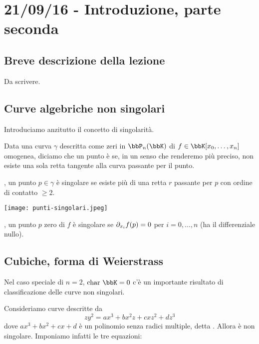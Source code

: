 \chapter{21/09/16 - Introduzione, parte seconda}
\section{Breve descrizione della lezione}
Da scrivere.
\section{Curve algebriche non singolari}

Introduciamo anzitutto il concetto di singolarità.

Data una curva $\gamma$ descritta come zeri in $\bbP_n(\bbK)$ di $f \in \bbK[x_0, \ldots,x_n]$ omogenea, diciamo che un punto è 
 se, in un senso che renderemo più preciso, non esiste una sola retta tangente alla curva passante per il punto. 

, un punto $p \in \gamma$ è singolare se esiste più di una retta $r$ passante per $p$ con ordine di contatto $\geq 2$. 
\vspace{1em}

\texttt{[image: punti-singolari.jpeg]}

, un punto $p$ zero di $f$ è singolare se $\partial_{x_i}f(p)=0$ per $i=0,\ldots,n$ (ha il differenziale nullo). 



\section{Cubiche, forma di Weierstrass}
Nel caso speciale di $n=2$, $\chr \bbK =0$ c'è un importante risultato di classificazione delle curve non singolari. 

Consideriamo curve descritte da
$$ zy^2= ax^3+bx^2z+cxz^2+dz^3 $$
 dove $ax^3+bx^2+cx+d$ è un polinomio senza radici multiple, detta . Allora è non singolare. Imponiamo infatti le tre equazioni:

